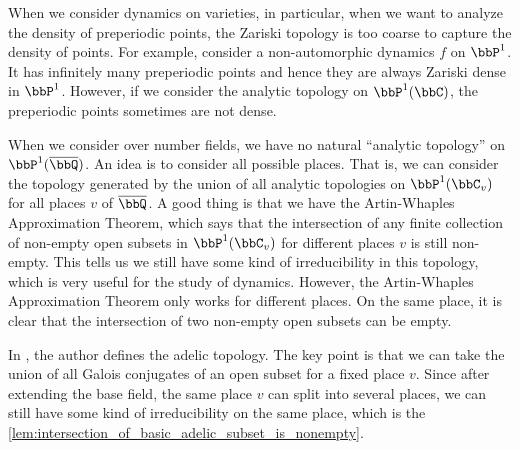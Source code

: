     \begin{remark}\label{rmk:motivation_of_adelic_topology}
        When we consider dynamics on varieties, in particular, when we want to analyze the density of preperiodic points,
        the Zariski topology is too coarse to capture the density of points.
        For example, consider a non-automorphic dynamics \(f\) on \(\bbP^1\).
        It has infinitely many preperiodic points and hence they are always Zariski dense in \(\bbP^1\).
        However, if we consider the analytic topology on \(\bbP^1(\bbC)\), the preperiodic points sometimes are not dense.

        When we consider over number fields, we have no natural ``analytic topology'' on \(\bbP^1(\overline{\bbQ})\).
        An idea is to consider all possible places.
        That is, we can consider the topology generated by the union of all analytic topologies on \(\bbP^1(\bbC_v)\) for all places \(v\) of \(\overline{\bbQ}\).
        A good thing is that we have the Artin-Whaples Approximation Theorem, which says that the intersection of any finite collection of non-empty open subsets in \(\bbP^1(\bbC_v)\) for different places \(v\) is still non-empty.
        This tells us we still have some kind of irreducibility in this topology, which is very useful for the study of dynamics.
        However, the Artin-Whaples Approximation Theorem only works for different places.
        On the same place, it is clear that the intersection of two non-empty open subsets can be empty.

        In \cite{Xie25ZDOsurfaces}, the author defines the adelic topology.
        The key point is that we can take the union of all Galois conjugates of an open subset for a fixed place \(v\).
        Since after extending the base field, the same place \(v\) can split into several places, we can still have some kind of irreducibility on the same place, which is the \cref{lem:intersection_of_basic_adelic_subset_is_nonempty}.
    \end{remark}

